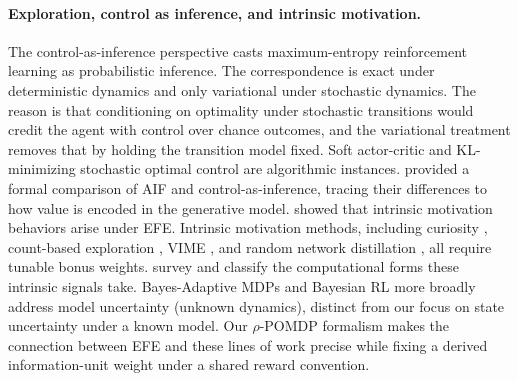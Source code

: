 \paragraph{Exploration, control as inference, and intrinsic motivation.}
The control-as-inference perspective \citep{todorov2007, levine2018} casts maximum-entropy reinforcement learning as probabilistic inference. The correspondence is exact under deterministic dynamics and only variational under stochastic dynamics. The reason is that conditioning on optimality under stochastic transitions would credit the agent with control over chance outcomes, and the variational treatment removes that by holding the transition model fixed. Soft actor-critic \citep{haarnoja2018} and KL-minimizing stochastic optimal control \citep{rawlik2012} are algorithmic instances. \citet{millidge2020} provided a formal comparison of AIF and control-as-inference, tracing their differences to how value is encoded in the generative model. \citet{sajid2021} showed that intrinsic motivation behaviors arise under EFE. Intrinsic motivation methods, including curiosity \citep{schmidhuber1991, pathak2017}, count-based exploration \citep{bellemare2016}, VIME \citep{houthooft2016}, and random network distillation \citep{burda2019}, all require tunable bonus weights. \citet{oudeyer2007} survey and classify the computational forms these intrinsic signals take. Bayes-Adaptive MDPs \citep{duff2002, guez2013} and Bayesian RL more broadly \citep{ghavamzadeh2015} address model uncertainty (unknown dynamics), distinct from our focus on state uncertainty under a known model. Our $\rho$-POMDP formalism makes the connection between EFE and these lines of work precise while fixing a derived information-unit weight under a shared reward convention.

